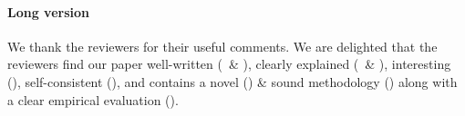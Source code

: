 \documentclass[10pt,twocolumn,letterpaper]{article}
\begin{document}

\clearpage
\newpage
\paragraph{Long version}

\noindent We thank the reviewers for their useful comments. We are delighted that the reviewers find our paper well-written (\Rone~\& \Rthree), clearly explained (\Rone~\& \Rthree), interesting (\Rtwo), self-consistent (\Rone),  and contains a novel (\Rfour) \& sound methodology (\Rtwo) along with a clear empirical evaluation (\Rthree). 
\end{document}
